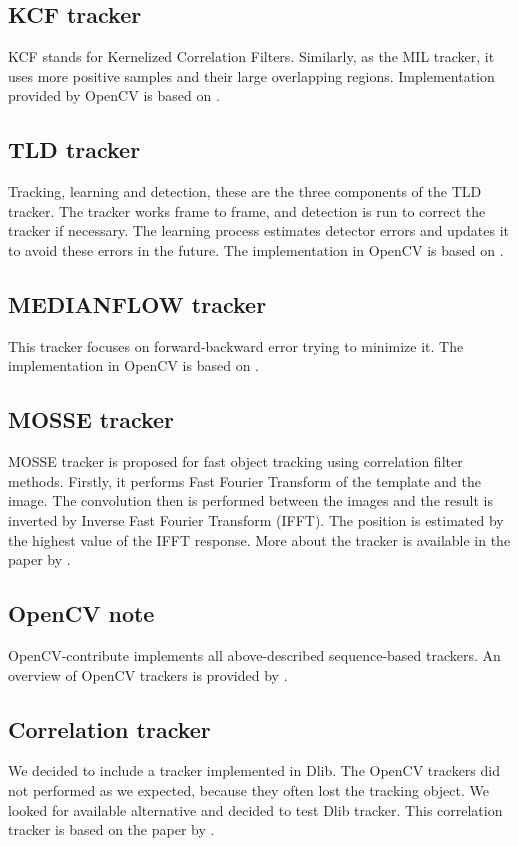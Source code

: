 \subsection*{KCF tracker}
KCF stands for Kernelized Correlation Filters. Similarly, as the MIL tracker,
it uses more positive samples and their large overlapping regions.
Implementation provided by OpenCV is based on \citet*{kcf}.

\subsection*{TLD tracker}
Tracking, learning and detection, these are the three components of the TLD
tracker. The tracker works frame to frame, and detection is run to correct the
tracker if necessary. The learning process estimates detector errors and updates it
to avoid these errors in the future. The implementation in OpenCV is based on
\citet*{tld}.

\subsection*{MEDIANFLOW tracker}
This tracker focuses on forward-backward error trying to minimize it. The
implementation in OpenCV is based on \citet*{medianflow}.

\subsection*{MOSSE tracker}
MOSSE tracker is proposed for fast object tracking using correlation filter
methods. Firstly, it performs Fast Fourier Transform of the template and the image.
The convolution then is performed between the images and the result is
inverted by Inverse Fast Fourier Transform (IFFT). The position is estimated by
the highest value of the IFFT response. More about the tracker is available in
the paper by \citet*{mosse}.

\subsection*{OpenCV note}
OpenCV-contribute implements all above-described sequence-based trackers. An
overview of OpenCV trackers is provided by \citet*{opencv-trackers}.

\subsection*{Correlation tracker}
We decided to include a tracker implemented in Dlib. The OpenCV trackers did
not performed as we expected, because they often lost the tracking object. We
looked for available alternative and decided to test Dlib tracker. This
correlation tracker is based on the paper by \citet*{correlation}.

